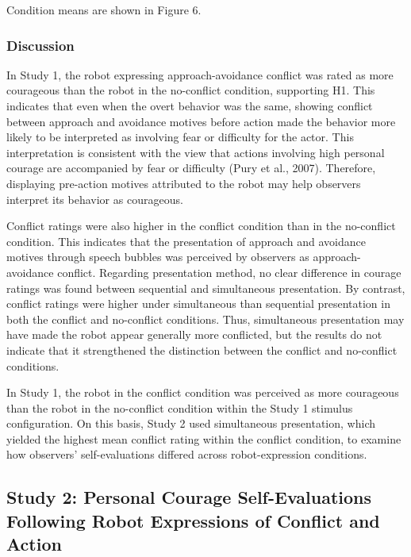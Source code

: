 \documentclass[
]{article}
\begin{document}
Condition means are shown in Figure 6.

\subsubsection{Discussion}\label{discussion}

In Study 1, the robot expressing approach-avoidance conflict was rated
as more courageous than the robot in the no-conflict condition,
supporting H1. This indicates that even when the overt behavior was the
same, showing conflict between approach and avoidance motives before
action made the behavior more likely to be interpreted as involving fear
or difficulty for the actor. This interpretation is consistent with the
view that actions involving high personal courage are accompanied by
fear or difficulty (Pury et al., 2007). Therefore, displaying pre-action
motives attributed to the robot may help observers interpret its
behavior as courageous.

Conflict ratings were also higher in the conflict condition than in the
no-conflict condition. This indicates that the presentation of approach
and avoidance motives through speech bubbles was perceived by observers
as approach-avoidance conflict. Regarding presentation method, no clear
difference in courage ratings was found between sequential and
simultaneous presentation. By contrast, conflict ratings were higher
under simultaneous than sequential presentation in both the conflict and
no-conflict conditions. Thus, simultaneous presentation may have made
the robot appear generally more conflicted, but the results do not
indicate that it strengthened the distinction between the conflict and
no-conflict conditions.

In Study 1, the robot in the conflict condition was perceived as more
courageous than the robot in the no-conflict condition within the Study
1 stimulus configuration. On this basis, Study 2 used simultaneous
presentation, which yielded the highest mean conflict rating within the
conflict condition, to examine how observers' self-evaluations differed
across robot-expression conditions.

\subsection{Study 2: Personal Courage Self-Evaluations Following Robot
Expressions of Conflict and
Action}\label{study-2-personal-courage-self-evaluations-following-robot-expressions-of-conflict-and-action}
\end{document}
